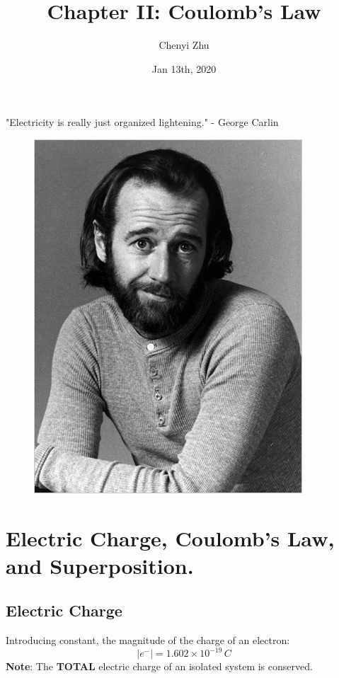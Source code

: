 \documentclass[11pt, letterpaper]{article}
\title{Chapter II: Coulomb's Law}
\author{Chenyi Zhu}
\date{Jan 13th, 2020}
\begin{document}
\begin{titlingpage}
	\maketitle
		\begin{center}
				"Electricity is really just organized lightening." - George Carlin
		\end{center}
		
		\begin{figure}[h!]
			\centering
			\includegraphics[scale=0.6]{george-carlin}
			\label{fig:comedian}
		\end{figure}
		
\end{titlingpage}
	
\section{Electric Charge, Coulomb's Law, and Superposition.} 


	\subsection{Electric Charge}
	Introducing constant, the magnitude of the charge of an electron: \[|e^-| = 1.602 \times 10^{-19}
	\,C\] 
	\textbf{Note}: The \textbf{TOTAL} electric charge of an isolated system is conserved.
	
\end{document}
